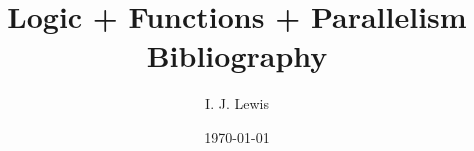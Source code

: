\documentclass{article}
\begin{document}
\title{Logic + Functions + Parallelism Bibliography}
\author{I. J. Lewis}
\date{\today}
\maketitle
\nocite{*}   %


\end{document}
